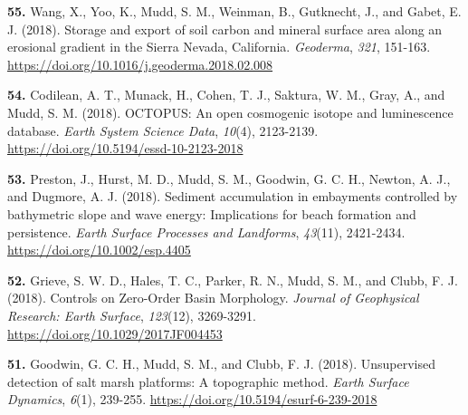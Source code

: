 \documentclass[10pt, a4paper]{article}
\newcommand{\years}[1]{\marginnote{\scriptsize #1}}
\begin{document}
\years{2018}\hangindent=0.7cm\textbf{55. }Wang, X., Yoo, K., Mudd, S. M., Weinman, B., Gutknecht, J., and Gabet, E. J. (2018). Storage and export of soil carbon and mineral surface area along an erosional gradient in the Sierra Nevada, California. \textit{Geoderma}, \textit{321}, 151-163. \href{https://doi.org/10.1016/j.geoderma.2018.02.008}{https://doi.org/10.1016/j.geoderma.2018.02.008}\par
\years{2018}\hangindent=0.7cm\textbf{54. }Codilean, A. T., Munack, H., Cohen, T. J., Saktura, W. M., Gray, A., and Mudd, S. M. (2018). OCTOPUS: An open cosmogenic isotope and luminescence database. \textit{Earth System Science Data}, \textit{10}(4), 2123-2139. \href{https://doi.org/10.5194/essd-10-2123-2018}{https://doi.org/10.5194/essd-10-2123-2018}\par
\years{2018}\hangindent=0.7cm\textbf{53. }Preston, J., Hurst, M. D., Mudd, S. M., Goodwin, G. C. H., Newton, A. J., and Dugmore, A. J. (2018). Sediment accumulation in embayments controlled by bathymetric slope and wave energy: Implications for beach formation and persistence. \textit{Earth Surface Processes and Landforms}, \textit{43}(11), 2421-2434. \href{https://doi.org/10.1002/esp.4405}{https://doi.org/10.1002/esp.4405}\par
\years{2018}\hangindent=0.7cm\textbf{52. }Grieve, S. W. D., Hales, T. C., Parker, R. N., Mudd, S. M., and Clubb, F. J. (2018). Controls on Zero-Order Basin Morphology. \textit{Journal of Geophysical Research: Earth Surface}, \textit{123}(12), 3269-3291. \href{https://doi.org/10.1029/2017JF004453}{https://doi.org/10.1029/2017JF004453}\par
\years{2018}\hangindent=0.7cm\textbf{51. }Goodwin, G. C. H., Mudd, S. M., and Clubb, F. J. (2018). Unsupervised detection of salt marsh platforms: A topographic method. \textit{Earth Surface Dynamics}, \textit{6}(1), 239-255. \href{https://doi.org/10.5194/esurf-6-239-2018}{https://doi.org/10.5194/esurf-6-239-2018}\par
\end{document}
